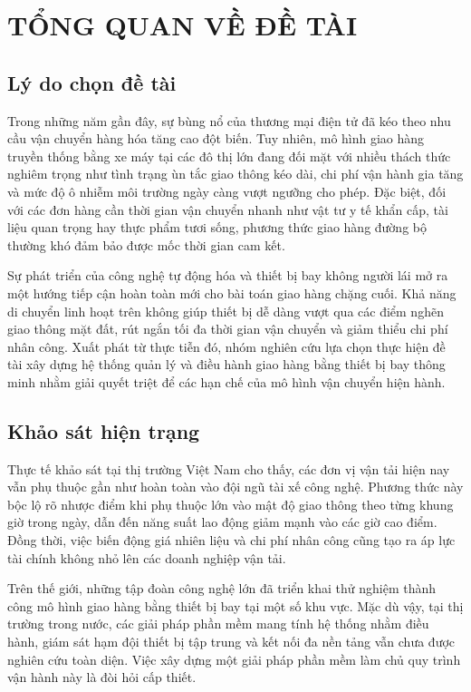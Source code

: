 ﻿\chapter{TỔNG QUAN VỀ ĐỀ TÀI}

\section{Lý do chọn đề tài}
Trong những năm gần đây, sự bùng nổ của thương mại điện tử đã kéo theo nhu cầu vận chuyển hàng hóa tăng cao đột biến. Tuy nhiên, mô hình giao hàng truyền thống bằng xe máy tại các đô thị lớn đang đối mặt với nhiều thách thức nghiêm trọng như tình trạng ùn tắc giao thông kéo dài, chi phí vận hành gia tăng và mức độ ô nhiễm môi trường ngày càng vượt ngưỡng cho phép. Đặc biệt, đối với các đơn hàng cần thời gian vận chuyển nhanh như vật tư y tế khẩn cấp, tài liệu quan trọng hay thực phẩm tươi sống, phương thức giao hàng đường bộ thường khó đảm bảo được mốc thời gian cam kết.

Sự phát triển của công nghệ tự động hóa và thiết bị bay không người lái mở ra một hướng tiếp cận hoàn toàn mới cho bài toán giao hàng chặng cuối. Khả năng di chuyển linh hoạt trên không giúp thiết bị dễ dàng vượt qua các điểm nghẽn giao thông mặt đất, rút ngắn tối đa thời gian vận chuyển và giảm thiểu chi phí nhân công. Xuất phát từ thực tiễn đó, nhóm nghiên cứu lựa chọn thực hiện đề tài xây dựng hệ thống quản lý và điều hành giao hàng bằng thiết bị bay thông minh nhằm giải quyết triệt để các hạn chế của mô hình vận chuyển hiện hành.

\section{Khảo sát hiện trạng}
Thực tế khảo sát tại thị trường Việt Nam cho thấy, các đơn vị vận tải hiện nay vẫn phụ thuộc gần như hoàn toàn vào đội ngũ tài xế công nghệ. Phương thức này bộc lộ rõ nhược điểm khi phụ thuộc lớn vào mật độ giao thông theo từng khung giờ trong ngày, dẫn đến năng suất lao động giảm mạnh vào các giờ cao điểm. Đồng thời, việc biến động giá nhiên liệu và chi phí nhân công cũng tạo ra áp lực tài chính không nhỏ lên các doanh nghiệp vận tải.

Trên thế giới, những tập đoàn công nghệ lớn đã triển khai thử nghiệm thành công mô hình giao hàng bằng thiết bị bay tại một số khu vực. Mặc dù vậy, tại thị trường trong nước, các giải pháp phần mềm mang tính hệ thống nhằm điều hành, giám sát hạm đội thiết bị tập trung và kết nối đa nền tảng vẫn chưa được nghiên cứu toàn diện. Việc xây dựng một giải pháp phần mềm làm chủ quy trình vận hành này là đòi hỏi cấp thiết.

